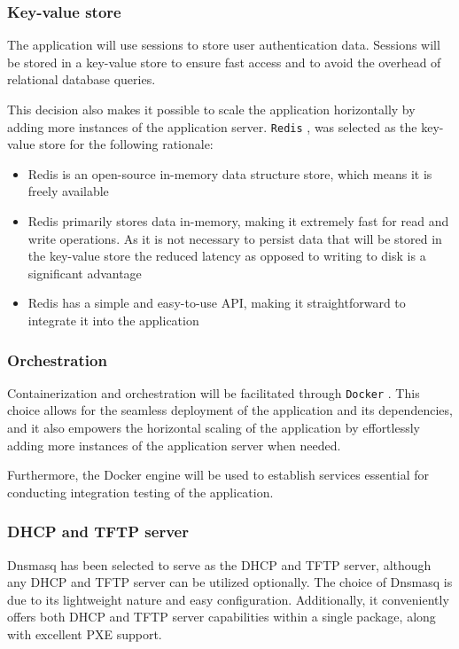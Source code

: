 \documentclass[../main.tex]{subfiles}
\begin{document}
\subsubsection{Key-value store}

The application will use sessions to store user authentication data. Sessions will be stored in a key-value store to ensure fast access and to avoid the overhead of relational database queries.

This decision also makes it possible to scale the application horizontally by adding more instances of the application server.
\texttt{Redis} \cite{redis}, was selected as the key-value store for the following rationale:

\begin{itemize}
  \item Redis is an open-source in-memory data structure store, which means it is freely available
  \item Redis primarily stores data in-memory, making it extremely fast for read and write operations. As it is not necessary to persist data that will be stored in the key-value store the reduced latency as opposed to writing to disk is a significant advantage
  \item Redis has a simple and easy-to-use API, making it straightforward to integrate it into the application
\end{itemize}

\subsubsection{Orchestration}

Containerization and orchestration will be facilitated through \texttt{Docker} \cite{docker}.
This choice allows for the seamless deployment of the application and its dependencies, and it also empowers the horizontal scaling of the application by effortlessly adding more instances of the application server when needed.

Furthermore, the Docker engine will be used to establish services essential for conducting integration testing of the application.

\subsubsection{DHCP and TFTP server}

Dnsmasq\cite{dnsmasq} has been selected to serve as the DHCP and TFTP server, although any DHCP and TFTP server can be utilized optionally. The choice of Dnsmasq is due to its lightweight nature and easy configuration.
Additionally, it conveniently offers both DHCP and TFTP server capabilities within a single package, along with excellent PXE support.
\end{document}
